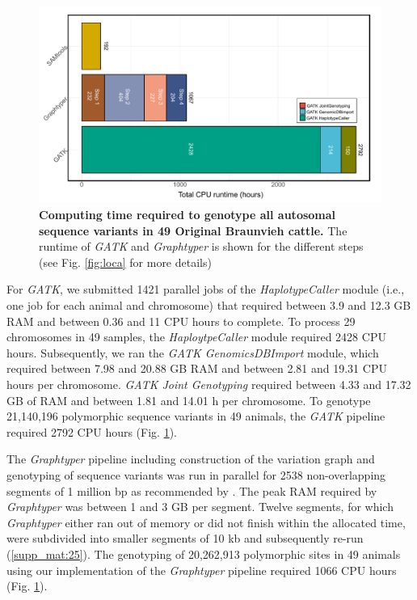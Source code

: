 \documentclass[../main.tex]{subfiles}
\begin{document}
\begin{figure}[!htb]
    \centering
    \includegraphics[width=\textwidth]{paper1/main_figure/Figure4.pdf}
    \caption[Computing time required for genotyping]{\textbf{Computing time required to genotype all autosomal sequence variants in 49 Original Braunvieh cattle.} The runtime of \emph{GATK} and \emph{Graphtyper }is shown for the different steps (see Fig. \ref{fig:loca} for more details)}
    \label{fig:varresource}
\end{figure}

For \emph{GATK}, we submitted 1421 parallel jobs of the \emph{HaplotypeCaller} module (i.e., one job for each animal and chromosome) that required between 3.9 and 12.3 GB RAM and between 0.36 and 11 CPU hours to complete.
To process 29 chromosomes in 49 samples, the \emph{HaploytpeCaller} module required 2428 CPU hours. 
Subsequently, we ran the \emph{GATK GenomicsDBImport} module, which required between 7.98 and 20.88 GB RAM and between 2.81 and 19.31 CPU hours per chromosome. 
\emph{GATK Joint Genotyping} required between 4.33 and 17.32 GB of RAM and between 1.81 and 14.01 h per chromosome. 
To genotype 21,140,196 polymorphic sequence variants in 49 animals, the \emph{GATK} pipeline required 2792 CPU hours (Fig. \ref{fig:varresource}).

The \emph{Graphtyper} pipeline including construction of the variation graph and genotyping of sequence variants was run in parallel for 2538 non-overlapping segments of 1 million bp as recommended by \citep{eggertsson2017graphtyper}. 
The peak RAM required by \emph{Graphtyper} was between 1 and 3 GB per segment. 
Twelve segments, for which \emph{Graphtyper} either ran out of memory or did not finish within the allocated time, were subdivided into smaller segments of 10 kb and subsequently re-run (\ref{supp_mat:25}).
The genotyping of 20,262,913 polymorphic sites in 49 animals using our implementation of the \emph{Graphtyper} pipeline required 1066 CPU hours (Fig. \ref{fig:varresource}).
\end{document}
